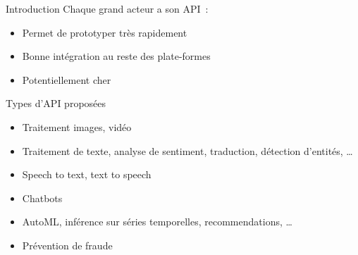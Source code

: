\begin{frame}{Introduction}
  Chaque grand acteur a son API~:

  \begin{itemize}[<+->]
    \item Permet de prototyper très rapidement
    \item Bonne intégration au reste des plate-formes
    \item Potentiellement cher
  \end{itemize}
\end{frame}

\begin{frame}{Types d'API proposées}
  \begin{itemize}[<+->]
    \item Traitement images, vidéo
    \item Traitement de texte, analyse de sentiment, traduction, détection d'entités, …
    \item Speech to text, text to speech
    \item Chatbots
    \item AutoML, inférence sur séries temporelles, recommendations, …
    \item Prévention de fraude
  \end{itemize}
\end{frame}
